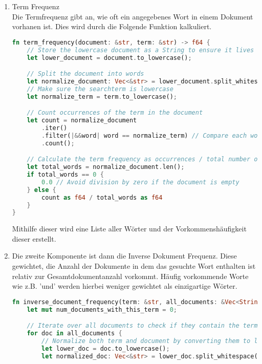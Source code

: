 \begin{enumerate}
    \item Term Frequenz \\
    Die Termfrequenz gibt an, wie oft ein angegebenes Wort in einem Dokument vorhanen ist. Dies wird durch die Folgende Funktion kalkuliert.
    
    \begin{lstlisting}[language=Rust]
fn term_frequency(document: &str, term: &str) -> f64 {
    // Store the lowercase document as a String to ensure it lives long enough
    let lower_document = document.to_lowercase(); 

    // Split the document into words
    let normalize_document: Vec<&str> = lower_document.split_whitespace().collect();
    // Make sure the searchterm is lowercase
    let normalize_term = term.to_lowercase();

    // Count occurrences of the term in the document
    let count = normalize_document
        .iter()
        .filter(|&&word| word == normalize_term) // Compare each word with the term
        .count();

    // Calculate the term frequency as occurrences / total number of words
    let total_words = normalize_document.len();
    if total_words == 0 {
        0.0 // Avoid division by zero if the document is empty
    } else {
        count as f64 / total_words as f64
    }
}\end{lstlisting}

    Mithilfe dieser wird eine Liste aller Wörter und der Vorkommenshäufigkeit dieser erstellt.

    \item Die zweite Komponente ist dann die Inverse Dokument Frequenz. Diese gewichtet, die Anzahl der Dokumente in dem das gesuchte Wort enthalten ist relativ zur Gesamtdokumentanzahl vorkommt. Häufig vorkommende Worte wie z.B. 'und' werden hierbei weniger gewichtet als einzigartige Wörter.

\begin{lstlisting}[language=Rust]
fn inverse_document_frequency(term: &str, all_documents: &Vec<String>) -> f64 {
    let mut num_documents_with_this_term = 0;

    // Iterate over all documents to check if they contain the term
    for doc in all_documents {
        // Normalize both term and document by converting them to lowercase
        let lower_doc = doc.to_lowercase();
        let normalized_doc: Vec<&str> = lower_doc.split_whitespace().collect();


\end{lstlisting}
\end{enumerate}
